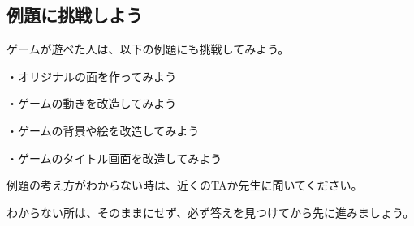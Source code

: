 \newpage
\subsection{例題に挑戦しよう}

ゲームが遊べた人は、以下の例題にも挑戦してみよう。

・オリジナルの面を作ってみよう

・ゲームの動きを改造してみよう

・ゲームの背景や絵を改造してみよう

・ゲームのタイトル画面を改造してみよう

例題の考え方がわからない時は、近くのTAか先生に聞いてください。

わからない所は、そのままにせず、必ず答えを見つけてから先に進みましょう。

